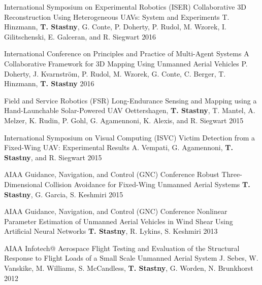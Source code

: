 \begin{cventries}
\begin{cvnumlist}
\item \cvpubentry
	{International Symposium on Experimental Robotics (ISER)} %
	{Collaborative 3D Reconstruction Using Heterogeneous UAVs: System and Experiments} %
	{T. Hinzmann, \textbf{T. Stastny}, G. Conte, P. Doherty, P. Rudol, M. Wzorek, I. Gilitschenski, E. Galceran, and R. Siegwart} %
	{} %
	{2016} %
	{} %
	{} %

\item \cvpubentry
	{International Conference on Principles and Practice of Multi-Agent Systems} %
	{A Collaborative Framework for 3D Mapping Using Unmanned Aerial Vehicles} %
	{P. Doherty, J. Kvarnstr{\"o}m, P. Rudol, M. Wzorek, G. Conte, C. Berger, T. Hinzmann, \textbf{T. Stastny}} %
	{} %
	{2016} %
	{} %
	{} %

\item \cvpubentry
	{Field and Service Robotics (FSR)} %
	{Long-Endurance Sensing and Mapping using a Hand-Launchable Solar-Powered UAV} %
	{Oettershagen, \textbf{T. Stastny}, T. Mantel, A. Melzer, K. Rudin, P. Gohl, G. Agamennoni, K. Alexis, and R. Siegwart} %
	{} %
	{2015} %
	{} %
	{} %

\item \cvpubentry
	{International Symposium on Visual Computing (ISVC)} %
	{Victim Detection from a Fixed-Wing UAV: Experimental Results} %
	{A. Vempati, G. Agamennoni, \textbf{T. Stastny}, and R. Siegwart} %
	{} %
	{2015} %
	{} %
	{} %
	
\item \cvpubentry
	{AIAA Guidance, Navigation, and Control (GNC) Conference} %
	{Robust Three-Dimensional Collision Avoidance for Fixed-Wing Unmanned Aerial Systems} %
	{\textbf{T. Stastny}, G. Garcia, S. Keshmiri} %
	{} %
	{2015} %
	{} %
	{} %
	
\item \cvpubentry
	{AIAA Guidance, Navigation, and Control (GNC) Conference} %
	{Nonlinear Parameter Estimation of Unmanned Aerial Vehicles in Wind Shear Using Artificial Neural Networks} %
	{\textbf{T. Stastny}, R. Lykins, S. Keshmiri} %
	{} %
	{2013} %
	{} %
	{} %
		
\item \cvpubentry
	{AIAA Infotech@ Aerospace} %
	{Flight Testing and Evaluation of the Structural Response to Flight Loads of a Small Scale Unmanned Aerial System} %
	{J. Sebes, W. Vanskike, M. Williams, S. McCandless, \textbf{T. Stastny}, G. Worden, N. Brunkhorst} %
	{} %
	{2012} %
	{} %
	{} %


\end{cvnumlist}
\end{cventries}
